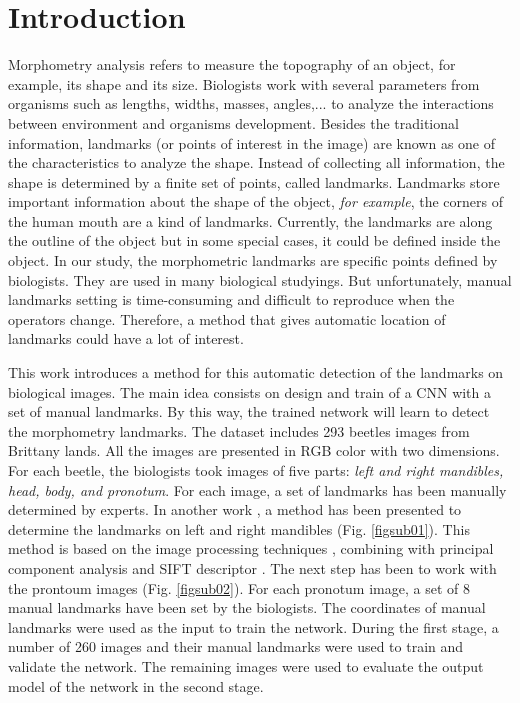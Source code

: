 \documentclass[conference]{IEEEtran}
\begin{document}
\section{Introduction}
Morphometry analysis refers to measure the topography of an object, for example, its shape and its size. Biologists work with several parameters from organisms such as lengths, widths, masses, angles,... to analyze the interactions between environment and organisms development. Besides the traditional information, landmarks (or points of interest in the image) are known as one of the characteristics to analyze the shape. Instead of collecting all information, the shape is determined by a finite set of points, called landmarks. Landmarks store important information about the shape of the object, \textit{for example}, the corners of the human mouth are a kind of landmarks. Currently, the landmarks are along the outline of the object but in some special cases, it could be defined inside the object. In our study, the morphometric landmarks are specific points defined by biologists. They are used in many biological studyings. But unfortunately, manual landmarks setting is time-consuming and difficult to reproduce when the operators change. Therefore, a method that gives automatic location of landmarks could have a lot of interest.

This work introduces a method for this automatic detection of the landmarks on biological images. The main idea consists on design and train of a CNN \cite{lecun2010convolutional} with a set of manual landmarks. By this way, the trained network will learn to detect the morphometry landmarks. The dataset includes 293 beetles images from Brittany lands. All the images are presented in RGB color with two dimensions. For each beetle, the biologists took images of five parts: \textit{left and right mandibles, head, body, and pronotum}. For each image, a set of landmarks has been manually determined by experts. In another work \cite{le2017maelab}, a method has been presented to determine the landmarks on left and right mandibles (Fig. \ref{figsub01}). This method is based on the image processing techniques \cite{canny1986computational}, combining with principal component analysis \cite{shlens2014tutorial} and SIFT descriptor \cite{lowe2004distinctive}. The next step has been to work with the prontoum images (Fig. \ref{figsub02}). For each pronotum image, a set of 8 manual landmarks have been set by the biologists. The coordinates of manual landmarks were used as the input to train the network. During the first stage, a number of 260 images and their manual landmarks were used to train and validate the network. The remaining images were used to evaluate the output model of the network in the second stage.
\end{document}
